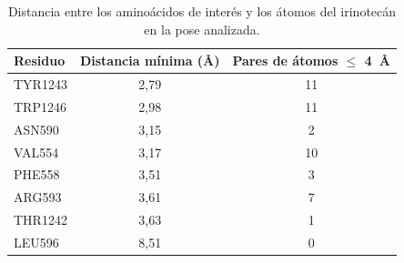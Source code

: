 \begin{table}[htbp]
\centering
\caption{Distancia entre los aminoácidos de interés y los átomos del irinotecán en la pose analizada.}
\label{tab:distancias_residuos}
\begin{tabular}{lcc}
\toprule
\textbf{Residuo} & \textbf{Distancia mínima (\AA)} & \textbf{Pares de átomos $\le$ 4~\AA} \\
\midrule
TYR1243 & 2,79 & 11 \\
TRP1246 & 2,98 & 11 \\
ASN590  & 3,15 & 2 \\
VAL554  & 3,17 & 10 \\
PHE558  & 3,51 & 3 \\
ARG593  & 3,61 & 7 \\
THR1242 & 3,63 & 1 \\
LEU596  & 8,51 & 0 \\
\bottomrule
\end{tabular}
\end{table}
